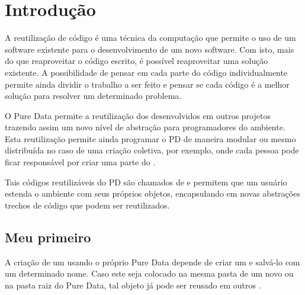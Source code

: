 \chapter{Introdução}


A reutilização de código é uma técnica da computação que permite o uso de um
software existente para o desenvolvimento de um novo software.
Com isto, mais do que reaproveitar o código escrito, é possível reaproveitar uma
solução existente.
A possibilidade de pensar em cada parte do código individualmente permite ainda
dividir o trabalho a ser feito e pensar se cada código é a melhor solução para
resolver um determinado problema.

O Pure Data permite a reutilização dos \patches desenvolvidos em outros projetos
trazendo assim um novo nível de abstração para programadores do ambiente.
Esta reutilização permite ainda programar o PD de maneira modular ou mesmo
distribuída no caso de uma criação coletiva, por exemplo, onde cada pessoa pode
ficar responsável por criar uma parte do \patch.

Tais códigos reutilizáveis do PD são chamados de \externals e permitem que um
usuário estenda o ambiente com seus próprios objetos, encapsulando em novas
abstrações trechos de código que podem ser reutilizados.

\section{Meu primeiro \external}

A criação de um \external usando o próprio Pure Data depende de criar um \patch
e salvá-lo com um determinado nome.
Caso este \patch seja colocado na mesma pasta de um novo \patch ou na pasta raiz
do Pure Data, tal objeto já pode ser reusado em outros \patches.

